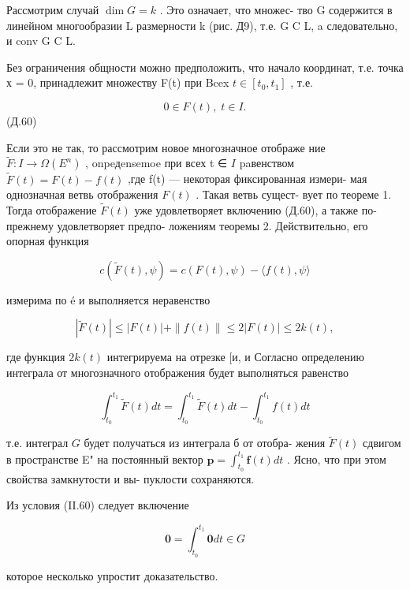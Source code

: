 \documentclass[8pt]{extarticle}
\begin{document}
Рассмотрим случай \(\dim G = k\) . Это означает, что множес- тво G содержится в линейном многообразии L размерности k (рис. Д9), т.е. G C L, a следовательно, и conv G C L.

Без ограничения общности можно предположить, что начало координат, т.е. точка х = 0, принадлежит множеству F(t) при Bcex \(t \in  \left\lbrack  {{t}_{0},{t}_{1}}\right\rbrack\) , т.е.

\[
0 \in  F\left( t\right) ,\;t \in  I.
\]
 (Д.60)

Если это не так, то рассмотрим новое многозначное отображе ние \(\widetilde{F} : I \rightarrow  \Omega \left( {E}^{n}\right)\) , onpeдensemoe при всех t ∈ \(I\) paвенством \(\widetilde{F}\left( t\right)  = F\left( t\right)  - f\left( t\right)\) ,где f(t) — некоторая фиксированная измери- мая однозначная ветвь отображения \(F\left( t\right)\) . Такая ветвь сущест- вует по теореме 1. Тогда отображение \(\widetilde{F}\left( t\right)\) уже удовлетворяет включению (Д.60), а также по-прежнему удовлетворяет предпо- ложениям теоремы 2. Действительно, его опорная функция

\[
c\left( {\widetilde{F}\left( t\right) ,\psi }\right)  = c\left( {F\left( t\right) ,\psi }\right)  - \langle f\left( t\right) ,\psi \rangle
\]

измерима по é и выполняется неравенство

\[
\left| {\widetilde{F}\left( t\right) }\right|  \leq  \left| {F\left( t\right) }\right|  + \parallel f\left( t\right) \parallel  \leq  2\left| {F\left( t\right) }\right|  \leq  {2k}\left( t\right) ,
\]

где функция \({2k}\left( t\right)\) интегрируема на отрезке [и, и Согласно определению интеграла от многозначного отображения будет выполняться равенство

\[
{\int }_{{t}_{0}}^{{t}_{1}}\widetilde{F}\left( t\right) {dt} = {\int }_{{t}_{0}}^{{t}_{1}}\widetilde{F}\left( t\right) {dt} - {\int }_{{t}_{0}}^{{t}_{1}}f\left( t\right) {dt}
\]

т.е. интеграл \(G\) будет получаться из интеграла б от отобра- жения \(\widetilde{F}\left( t\right)\) сдвигом в пространстве E" на постоянный вектор \(\mathbf{p} = {\int }_{{t}_{0}}^{{t}_{1}}\mathbf{f}\left( t\right) {dt}\) . Ясно, что при этом свойства замкнутости и вы- пуклости сохраняются.

Из условия (II.60) следует включение

\[
\mathbf{0} = {\int }_{{t}_{0}}^{{t}_{1}}\mathbf{0}{dt} \in  G
\]

которое несколько упростит доказательство.
\end{document}
